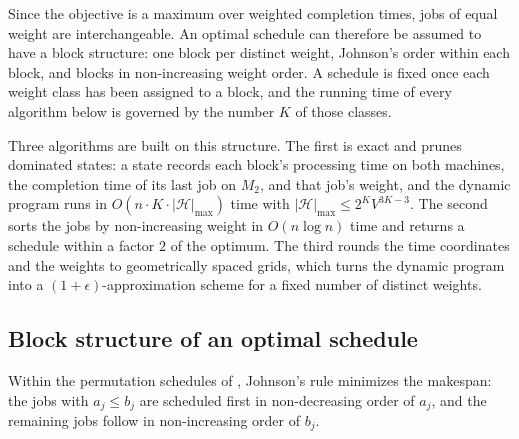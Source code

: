 ﻿\documentclass[12pt]{article}
\begin{document}
\begin{sloppypar}
Since the objective is a maximum over weighted completion times, jobs of equal weight are
interchangeable. An optimal schedule can therefore be assumed to have a block structure:
one block per distinct weight, Johnson's order within each block, and blocks in
non-increasing weight order. A schedule is fixed once each weight class has been assigned to
a block, and the running time of every algorithm below is governed by the number $K$ of those
classes.

Three algorithms are built on this structure. The first is exact and prunes dominated states:
a state records each block's processing time on both machines, the completion time of its last
job on $M_2$, and that job's weight, and the dynamic program runs in
$O(n \cdot K \cdot |\mathscr{H}|_{\max})$ time with
$|\mathscr{H}|_{\max} \le 2^{K}V^{3K-3}$. The second sorts the jobs by non-increasing weight in
$O(n\log n)$ time and returns a schedule within a factor $2$ of the optimum. The third rounds
the time coordinates and the weights to geometrically spaced grids, which turns the dynamic
program into a $(1+\epsilon)$-approximation scheme for a fixed number of distinct weights.

\subsection{Block structure of an optimal schedule}
Within the permutation schedules of , Johnson's rule
\citep{pinedo2022scheduling} minimizes the makespan: the jobs with $a_j \le b_j$ are scheduled
first in non-decreasing order of $a_j$, and the remaining jobs follow in non-increasing order of
$b_j$.


\end{sloppypar}
\end{document}
